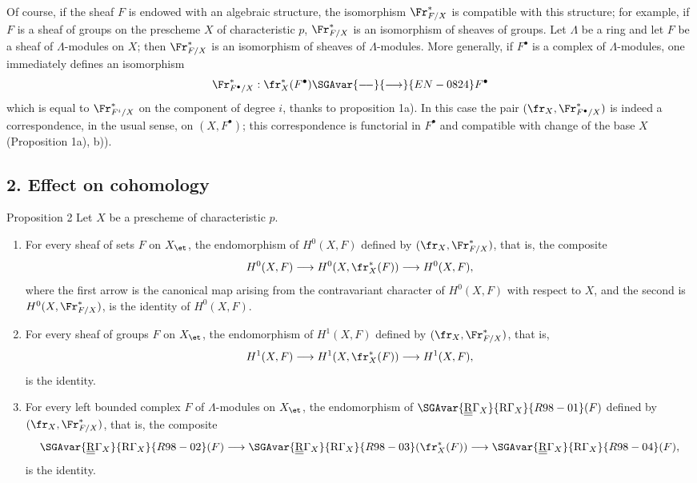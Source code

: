 Of course, if the sheaf $F$ is endowed with an algebraic structure, the isomorphism $\Fr^*_{F/X}$ is compatible with this structure; for example, if $F$ is a sheaf of groups on the prescheme $X$ of characteristic $p$, $\Fr^*_{F/X}$ is an isomorphism of sheaves of groups. Let $\Lambda$ be a ring and let $F$ be a sheaf of $\Lambda$-modules on $X$; then $\Fr^*_{F/X}$ is an isomorphism of sheaves of $\Lambda$-modules. More generally, if $F^\bullet$ is a complex of $\Lambda$-modules, one immediately defines an isomorphism
\[
\Fr^*_{F^\bullet/X}:\fr_X^*(F^\bullet)\SGAvar{\relbar\joinrel\relbar}{\longrightarrow}{EN-0824} F^\bullet
\]
which is equal to $\Fr^*_{F^i/X}$ on the component of degree $i$, thanks to proposition 1a). In this case the pair $(\fr_X,\Fr^*_{F^\bullet/X})$ is indeed a correspondence, in the usual sense, on $(X,F^\bullet)$; this correspondence is functorial in $F^\bullet$ and compatible with change of the base $X$ (Proposition 1a), b)).

\subsection*{2. Effect on cohomology}

\begin{statement}{Proposition 2}
Let $X$ be a prescheme of characteristic $p$.
\begin{enumerate}[label=\alph*)]
\item For every sheaf of sets $F$ on $X_{\et}$, the endomorphism of $H^0(X,F)$ defined by $(\fr_X,\Fr^*_{F/X})$, that is, the composite
\[
H^0(X,F)\longrightarrow H^0(X,\fr_X^*(F))\longrightarrow H^0(X,F),
\]
where the first arrow is the canonical map arising from the contravariant character of $H^0(X,F)$ with respect to $X$, and the second is $H^0(X,\Fr^*_{F/X})$, is the identity of $H^0(X,F)$.
\item For every sheaf of groups $F$ on $X_{\et}$, the endomorphism of $H^1(X,F)$ defined by $(\fr_X,\Fr^*_{F/X})$, that is,
\[
H^1(X,F)\longrightarrow H^1(X,\fr_X^*(F))\longrightarrow H^1(X,F),
\]
is the identity.
\item For every left bounded complex $F$ of $\Lambda$-modules on $X_{\et}$, the endomorphism of $\SGAvar{\underline{\underline{\mathrm{R}}}\Gamma_X}{\mathrm{R}\Gamma_X}{R98-01}(F)$ defined by $(\fr_X,\Fr^*_{F/X})$, that is, the composite
\[
\SGAvar{\underline{\underline{\mathrm{R}}}\Gamma_X}{\mathrm{R}\Gamma_X}{R98-02}(F)\longrightarrow \SGAvar{\underline{\underline{\mathrm{R}}}\Gamma_X}{\mathrm{R}\Gamma_X}{R98-03}(\fr_X^*(F))\longrightarrow \SGAvar{\underline{\underline{\mathrm{R}}}\Gamma_X}{\mathrm{R}\Gamma_X}{R98-04}(F),
\]
is the identity.
\end{enumerate}
\end{statement}

